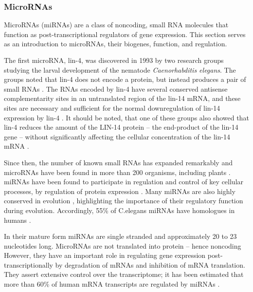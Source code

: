 \subsubsection{MicroRNAs}\label{micrornas}

MicroRNAs (miRNAs) are a class of noncoding, small RNA molecules that function
as post-transcriptional regulators of gene expression. This section serves as
an introduction to microRNAs, their biogenes, function, and regulation.

The first microRNA, lin-4, was discovered in 1993 by two research groups
studying the larval development of the nematode \emph{Caenorhabditis elegans}.
The groups noted that lin-4 does not encode a protein, but instead produces a
pair of small RNAs \citep{Lee1993,T1,T2}. The RNAs encoded by lin-4 have several
conserved antisense complementarity sites in an untranslated region of the
lin-14 mRNA, and these sites are necessary and sufficient for the normal
downregulation of lin-14 expression by lin-4 \citep{Lee1993,Wightman1993}. It
should be noted, that one of these groups also showed that lin-4 reduces the
amount of the LIN-14 protein -- the end-product of the lin-14 gene -- without
significantly affecting the cellular concentration of the lin-14 mRNA
\citep{??}.

Since then, the number of known small RNAs has expanded remarkably and
microRNAs have been found in more than 200 organisms, including plants
\citep{T3}. miRNAs have been found to participate in regulation and control of key cellular
processes, by regulation of protein expression \citep{T4}. Many miRNAs are
also highly conserved in evolution \citep{Bartel2004}, highlighting the
importance of their regulatory function during evolution. Accordingly, 55\% of
C.elegans miRNAs have homologues in humans \cite{T5}.

In their mature form miRNAs are single stranded and approximately 20 to 23
nucleotides long. MicroRNAs are not translated into protein -- hence noncoding
However, they have an important role in regulating gene expression post-
transcriptionally by degradation of mRNAs and inhibition of mRNA translation.
They assert extensive control over the transcriptome; it has been estimated
that more than 60\% of human mRNA transcripts are regulated by miRNAs
\citep{CITE}.

